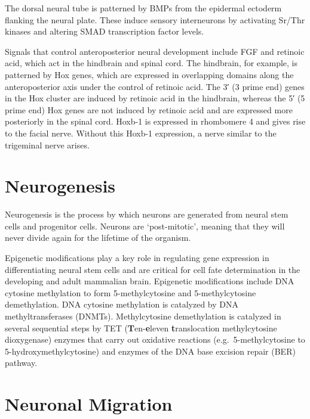 \documentclass[]{book}
\begin{document}
The dorsal neural tube is patterned by BMPs from the epidermal ectoderm flanking the neural plate. These induce sensory interneurons by activating Sr/Thr kinases and altering SMAD transcription factor levels.

Signals that control anteroposterior neural development include FGF and retinoic acid, which act in the hindbrain and spinal cord. The hindbrain, for example, is patterned by Hox genes, which are expressed in overlapping domains along the anteroposterior axis under the control of retinoic acid. The 3′ (3 prime end) genes in the Hox cluster are induced by retinoic acid in the hindbrain, whereas the 5′ (5 prime end) Hox genes are not induced by retinoic acid and are expressed more posteriorly in the spinal cord. Hoxb-1 is expressed in rhombomere 4 and gives rise to the facial nerve. Without this Hoxb-1 expression, a nerve similar to the trigeminal nerve arises.

\hypertarget{neurogenesis}{%
\section{Neurogenesis}\label{neurogenesis}}

Neurogenesis is the process by which neurons are generated from neural stem cells and progenitor cells. Neurons are `post-mitotic', meaning that they will never divide again for the lifetime of the organism.

Epigenetic modifications play a key role in regulating gene expression in differentiating neural stem cells and are critical for cell fate determination in the developing and adult mammalian brain. Epigenetic modifications include DNA cytosine methylation to form 5-methylcytosine and 5-methylcytosine demethylation. DNA cytosine methylation is catalyzed by DNA methyltransferases (DNMTs). Methylcytosine demethylation is catalyzed in several sequential steps by TET (\textbf{T}en-\textbf{e}leven \textbf{t}ranslocation methylcytosine dioxygenase) enzymes that carry out oxidative reactions (e.g.~5-methylcytosine to 5-hydroxymethylcytosine) and enzymes of the DNA base excision repair (BER) pathway.

\hypertarget{neuronal-migration}{%
\section{Neuronal Migration}\label{neuronal-migration}}
\end{document}
